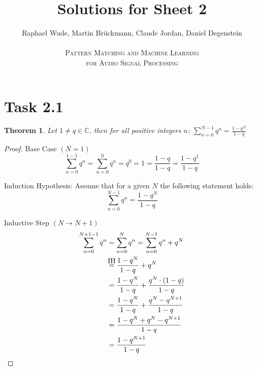 \documentclass[12pt]{article}
\newcommand{\C}{\mathbb{C}}
\newtheorem{thm}{Theorem}
\newcommand\myeq{\stackrel{\mathclap{\normalfont\mbox{IH}}}{=}}
\begin{document}
\title{Solutions for Sheet 2}
\author{Raphael Wude, Martin Brückmann, Claude Jordan, Daniel Degenstein\\ \\
\textsc{Pattern Matching and Machine Learning} \\
\textsc{for Audio Signal Processing}}
\maketitle

\section*{Task 2.1}
\begin{thm} Let $1 \neq q \in \C$, then for all positive integers $n$: $\sum^{N-1}_{n=0}q^n = \frac{1-q^N}{1-q}$\end{thm}
\begin{proof}
Base Case $\left(N=1\right)$
$$\sum^{1-1}_{n=0}q^n 
= \sum^{0}_{n=0}q^n 
= q^0 
= 1 
= \frac{1-q}{1-q} 
= \frac{1-q^1}{1-q}$$

Induction Hypothesis: Assume that for a given  $N$ the following statement holds:
$$\sum^{N-1}_{n=0}q^n = \frac{1-q^N}{1-q}$$

Inductive Step $\left(N \longrightarrow N+1\right)$
\begin{align*} 
\sum^{N+1-1}_{n=0}q^n &= \sum^{N}_{n=0}q^n = \sum^{N-1}_{n=0}q^n + q^N \\
&\myeq \frac{1-q^N}{1-q} + q^N \\
&= \frac{1-q^N}{1-q} + \frac{q^N\cdot (1-q)}{1-q} \\
&= \frac{1-q^N}{1-q} + \frac{q^N-q^{N+1}}{1-q} \\
&= \frac{1-q^N+q^N-q^{N+1}}{1-q}\\
&= \frac{1-q^{N+1}}{1-q}
\end{align*}
\end{proof}

 
\end{document}
